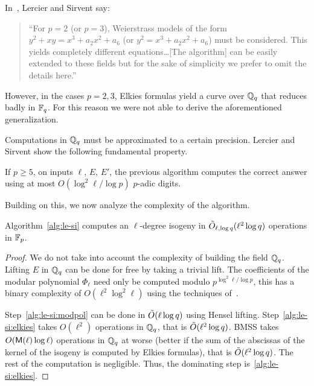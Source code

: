 \begin{nota}
  In~\cite{lercier+sirvent08}, Lercier and Sirvent say:
  \begin{quote}
    ``For $p = 2$ (or $p = 3$), Weierstrass models of the form $y^2 + xy
    = x^3 + a_2 x^2 + a_6$ (or $y^2 = x^3 + a_2 x^2 + a_6$) must be
    considered. This yields completely different equations\dots [The
    algorithm] can be easily extended to these fields but for the
    sake of simplicity we prefer to omit the details here.''
  \end{quote}
  
  However, in the cases $p=2,3$, Elkies formulas yield a curve over
  $\mathbb{Q}_q$ that reduces badly in $\mathbb{F}_q$. For this reason we were not
  able to derive the aforementioned generalization.
\end{nota}

Computations in $\mathbb{Q}_q$ must be approximated to a certain
precision. Lercier and Sirvent show the following fundamental
property.

\begin{proposition}
  If $p\ge5$, on inputs $\ell$, $E$, $E'$, the previous algorithm
  computes the correct answer using at most $O(\log^2\ell/\log p)$
  $p$-adic digits.
\end{proposition}

Building on this, we now analyze the complexity of the algorithm.

\begin{proposition}
  \label{th:lercier-sirvent}
  Algorithm~\ref{alg:le-si} computes an $\ell$-degree isogeny in
  $\tilde{O}_{\ell,\log q}(\ell^2\log q)$ operations in $\mathbb{F}_p$.
\end{proposition}
\begin{proof}
  We do not take into account the complexity of building the field
  $\mathbb{Q}_q$. Lifting $E$ in $\mathbb{Q}_q$ can be done for free by taking a
  trivial lift. The coefficients of the modular polynomial $\Phi_\ell$
  need only be computed modulo $p^{\log^2\ell/\log p}$, this has a
  binary complexity of $O(\ell^2\log^2\ell)$ using the techniques
  of~\cite{sutherland10:modpol}.

  Step~\ref{alg:le-si:modpol} can be done in $\tilde{O}(\ell\log q)$
  using Hensel lifting. Step~\ref{alg:le-si:elkies} takes $O(\ell^2)$
  operations in $\mathbb{Q}_q$, that is $\tilde{O}(\ell^2\log q)$. BMSS takes
  $O(\mathsf{M}(\ell)\log\ell)$ operations in $\mathbb{Q}_q$ at worse (better if
  the sum of the abscissas of the kernel of the isogeny is computed by
  Elkies formulas), that is $\tilde{O}(\ell^2\log q)$. The rest of the
  computation is negligible. Thus, the dominating step
  is~\ref{alg:le-si:elkies}.
\end{proof}

